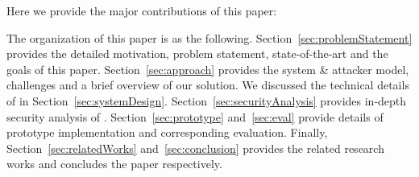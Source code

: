  Here we provide the major contributions of this paper:
\begin{mylist}
  \item
\end{mylist}

 The organization of this paper is as the following. Section~\ref{sec:problemStatement} provides the detailed motivation, problem statement, state-of-the-art and the goals of this paper. Section~\ref{sec:approach} provides the system \& attacker model, challenges and a brief overview of our solution. We discussed the technical details of \name in Section~\ref{sec:systemDesign}. Section~\ref{sec:securityAnalysis} provides in-depth security analysis of \name. Section~\ref{sec:prototype} and~\ref{sec:eval} provide details of \name prototype implementation and corresponding evaluation. Finally, Section~\ref{sec:relatedWorks} and~\ref{sec:conclusion} provides the related research works and concludes the paper respectively.




 